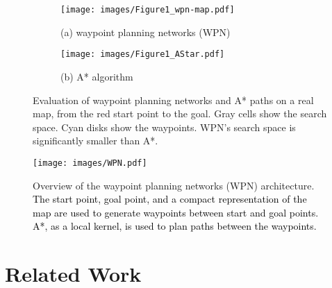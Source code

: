\documentclass[journal, twocolumn]{IEEEtran}
\begin{document}
\begin{figure}[t!]
  \centering
  \begin{subfigure}[b]{0.48\linewidth}

    \texttt{[image: images/Figure1\_wpn-map.pdf]}
    \caption*{\centering \scriptsize (a) waypoint planning networks (WPN)}
  \end{subfigure}
  \begin{subfigure}[b]{0.48\linewidth}

    \texttt{[image: images/Figure1\_AStar.pdf]}
    \caption*{\scriptsize (b) A* algorithm}
  \end{subfigure}

    \caption{Evaluation of waypoint planning networks and A* paths on a real map, from the red start point to the goal.
    Gray cells show the search space. Cyan disks show the waypoints. WPN's search space is significantly smaller than A*.} 
    \vspace{-5 mm}
  \label{fig: intro_show}
\end{figure}


\begin{figure*}[ht!]
    \centering
    \texttt{[image: images/WPN.pdf]}
    \caption{Overview of the waypoint planning networks (WPN) architecture. \textcolor{black}{The start point, goal point, and a compact representation of the map are used to generate waypoints between start and goal points. A*, as a local kernel, is used to plan paths between the waypoints.} }
    \label{fig:my_label}
        \vspace{-5 mm}
\end{figure*}

\section{Related Work}
\end{document}
